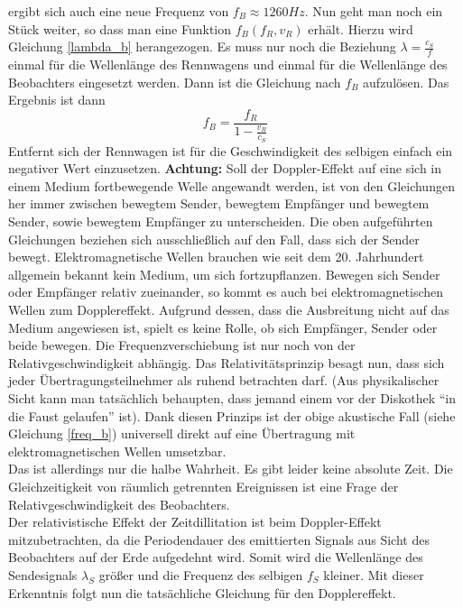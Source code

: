 ergibt sich auch eine neue Frequenz von \begin{math}{f_B \approx 1260 Hz} \end{math}. Nun geht man noch ein Stück weiter, so dass man eine Funktion 
\begin{math}{f_B(f_R,v_R)} \end{math} erhält. Hierzu wird Gleichung \ref{lambda_b} herangezogen. Es muss nur noch die Beziehung \begin{math}{\lambda=\frac{c_S}{f}} \end{math} 
einmal für die Wellenlänge des Rennwagens und einmal für die Wellenlänge des Beobachters eingesetzt werden. Dann ist die Gleichung nach \begin{math}{f_B} \end{math} aufzulösen.  
Das Ergebnis ist dann         
\begin{equation}
\label{freq_b}
f_B=\frac{f_R}{1-\frac{v_R}{c_S}}
\end{equation}
Entfernt sich der Rennwagen ist für die Geschwindigkeit des selbigen einfach ein negativer Wert einzusetzen. \textbf{Achtung:} Soll der Doppler-Effekt auf eine sich in einem Medium fortbewegende
Welle angewandt werden, ist von den Gleichungen her immer zwischen bewegtem Sender, bewegtem Empfänger und bewegtem Sender, sowie bewegtem Empfänger zu unterscheiden. 
Die oben aufgeführten Gleichungen beziehen sich ausschließlich auf den Fall, dass sich der Sender bewegt. 
\newpar
Elektromagnetische Wellen brauchen wie seit dem 20. Jahrhundert allgemein bekannt kein Medium, um sich fortzupflanzen. Bewegen sich Sender oder Empfänger relativ zueinander, so kommt es auch bei elektromagnetischen Wellen zum Dopplereffekt. Aufgrund dessen, dass die Ausbreitung nicht auf das Medium angewiesen ist, spielt es keine Rolle, ob sich Empfänger, Sender oder beide bewegen. Die Frequenzverschiebung ist nur noch von der Relativgeschwindigkeit abhängig. Das Relativitätsprinzip besagt nun, dass sich jeder Übertragungsteilnehmer als ruhend betrachten darf. (Aus physikalischer Sicht kann man tatsächlich behaupten, dass jemand einem vor der Diskothek "`in die Faust gelaufen"' ist). Dank diesen Prinzips ist der obige akustische Fall (siehe Gleichung \ref{freq_b}) universell direkt auf eine Übertragung mit elektromagnetischen Wellen umsetzbar. 
\\Das ist allerdings nur die halbe Wahrheit. Es gibt leider keine absolute Zeit. Die Gleichzeitigkeit von räumlich getrennten Ereignissen ist eine Frage der Relativgeschwindigkeit des Beobachters. 
\\Der relativistische Effekt der Zeitdillitation ist beim Doppler-Effekt mitzubetrachten, da die Periodendauer des emittierten Signals aus Sicht des Beobachters auf der Erde aufgedehnt wird. Somit wird die Wellenlänge des Sendesignals \begin{math}{\lambda_S}\end{math} größer und die Frequenz des selbigen \begin{math}{f_S}\end{math} kleiner. Mit dieser Erkenntnis folgt nun die tatsächliche Gleichung für den Dopplereffekt.  
